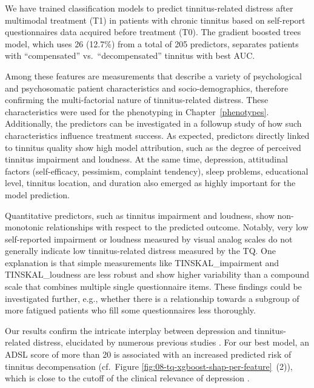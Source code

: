 \documentclass[
  oneside]{book}
\begin{document}
We have trained classification models to predict tinnitus-related distress after multimodal treatment (T1) in patients with chronic tinnitus based on self-report questionnaires data acquired before treatment (T0).
The gradient boosted trees model, which uses 26 (12.7\%) from a total of 205 predictors, separates patients with ``compensated'' vs.~``decompensated'' tinnitus with best AUC.

Among these features are measurements that describe a variety of psychological and psychosomatic patient characteristics and socio-demographics, therefore confirming the multi-factorial nature of tinnitus-related distress.
These characteristics were used for the phenotyping in Chapter~\ref{phenotypes}.
Additionally, the predictors can be investigated in a followup study of how such characteristics influence treatment success.
As expected, predictors directly linked to tinnitus quality show high model attribution, such as the degree of perceived tinnitus impairment and loudness.
At the same time, depression, attitudinal factors (self-efficacy, pessimism, complaint tendency), sleep problems, educational level, tinnitus location, and duration also emerged as highly important for the model prediction.

Quantitative predictors, such as tinnitus impairment and loudness, show non-monotonic relationships with respect to the predicted outcome.
Notably, very low self-reported impairment or loudness measured by visual analog scales do not generally indicate low tinnitus-related distress measured by the TQ.
One explanation is that simple measurements like TINSKAL\_impairment and TINSKAL\_loudness are less robust and show higher variability than a compound scale that combines multiple single questionnaire items.
These findings could be investigated further, e.g., whether there is a relationship towards a subgroup of more fatigued patients who fill some questionnaires less thoroughly.

Our results confirm the intricate interplay between depression and tinnitus-related distress, elucidated by numerous previous studies \autocite{Dobie:DepressionTinnitus2003,Folmer:Tinnitus1999,Halford:AnxietyDepressionTinnitus1991,Langguth:TinnitusDepression2011,Salazar:Depression2019}.
For our best model, an ADSL score of more than 20 is associated with an increased predicted risk of tinnitus decompensation (cf.~Figure \ref{fig:08-tq-xgboost-shap-per-feature}~(2)), which is close to the cutoff of the clinical relevance of depression \autocite{Hautzinger:ADSL2003}.
\end{document}
